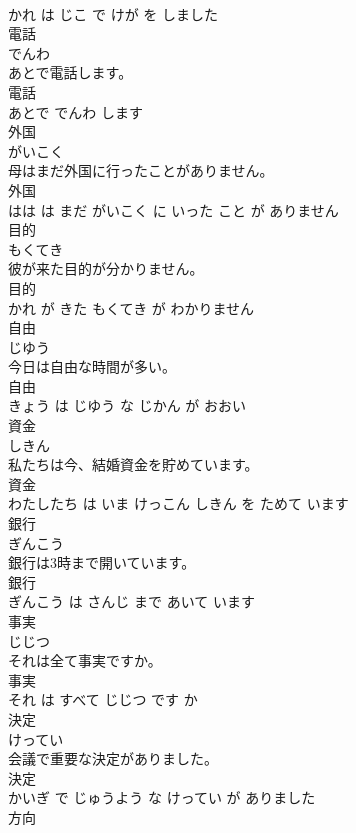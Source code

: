 \documentclass[8pt]{extreport}
\begin{document}
\begin{CJK}{UTF8}{min}
\\	かれ は じこ で けが を しました			
\\	電話	
\\	でんわ			
\\	あとで電話します。	
\\	電話 
\\	あとで でんわ します			
\\	外国	
\\	がいこく			
\\	母はまだ外国に行ったことがありません。	
\\	外国 
\\	はは は まだ がいこく に いった こと が ありません			
\\	目的	
\\	もくてき			
\\	彼が来た目的が分かりません。	
\\	目的 
\\	かれ が きた もくてき が わかりません			
\\	自由	
\\	じゆう			
\\	今日は自由な時間が多い。	
\\	自由 
\\	きょう は じゆう な じかん が おおい			
\\	資金	
\\	しきん			
\\	私たちは今、結婚資金を貯めています。	
\\	資金 
\\	わたしたち は いま けっこん しきん を ためて います			
\\	銀行	
\\	ぎんこう			
\\	銀行は3時まで開いています。	
\\	銀行 
\\	ぎんこう は さんじ まで あいて います			
\\	事実	
\\	じじつ			
\\	それは全て事実ですか。	
\\	事実 
\\	それ は すべて じじつ です か			
\\	決定	
\\	けってい			
\\	会議で重要な決定がありました。	
\\	決定 
\\	かいぎ で じゅうよう な けってい が ありました			
\\	方向	

\end{CJK}
\end{document}
